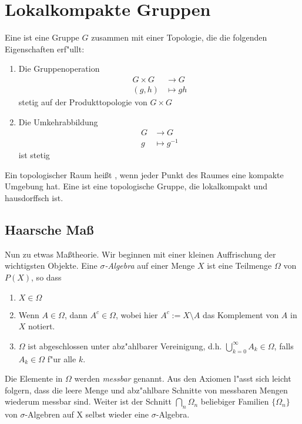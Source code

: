 \section{Lokalkompakte Gruppen}
\begin{defi}
	Eine  ist eine Gruppe $G$ zusammen mit einer Topologie, die die folgenden Eigenschaften erf"ullt:
	\begin{enumerate}[label=(\roman*), leftmargin=*, align=left, labelsep=1pt]
		\item Die Gruppenoperation
			\begin{align*}
				G \times G &\to G\\
				(g,h) &\mapsto gh
			\end{align*}
		stetig auf der Produkttopologie von $G \times G$
		\item Die Umkehrabbildung
			\begin{align*}
				G &\to G\\
				g &\mapsto g^{-1}
			\end{align*}
			ist stetig
	\end{enumerate}
\end{defi}

\begin{defi}
	Ein topologischer Raum heißt , wenn jeder Punkt des Raumes eine kompakte Umgebung hat. Eine  ist eine topologische Gruppe, die lokalkompakt und hausdorffsch ist. 
\end{defi}
\subsection{Haarsche Maß}
	Nun zu etwas Maßtheorie. Wir beginnen mit einer kleinen Auffrischung der wichtigsten Objekte. Eine \emph{$\sigma$-Algebra} auf einer Menge $X$ ist eine Teilmenge $\Omega$ von $P(X)$, so dass
	\begin{enumerate}[label=(\roman*)]
		\item $X \in \Omega$
		\item Wenn $A \in \Omega$, dann $A^c \in \Omega$, wobei hier $A^c := X\setminus A$ das Komplement von $A$ in $X$ notiert.
		\item $\Omega$ ist abgeschlossen unter abz"ahlbarer Vereinigung, d.h. $\bigcup_{k=0}^{\infty} A_k \in \Omega$, falls $A_k \in \Omega$ f"ur alle $k$.
	\end{enumerate}
	Die Elemente in $\Omega$ werden \emph{messbar} genannt. Aus den Axiomen l"asst sich leicht folgern, dass die leere Menge und abz"ahlbare Schnitte von messbaren Mengen wiederum messbar sind. Weiter ist der Schnitt $\bigcap_n \Omega_n$ beliebiger Familien $\{\Omega_n\}$ von $\sigma$-Algebren auf X selbst wieder eine $\sigma$-Algebra.
	
